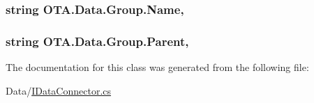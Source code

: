 \subsubsection[{Name}]{\setlength{\rightskip}{0pt plus 5cm}string O\+T\+A.\+Data.\+Group.\+Name\hspace{0.3cm}{\ttfamily [get]}, {\ttfamily [set]}}\label{class_o_t_a_1_1_data_1_1_group_af014f919d424622fe09aa7246e59990e}
\hypertarget{class_o_t_a_1_1_data_1_1_group_abb44e1c5f261b87431a22599e2fb7595}{}
\subsubsection[{Parent}]{\setlength{\rightskip}{0pt plus 5cm}string O\+T\+A.\+Data.\+Group.\+Parent\hspace{0.3cm}{\ttfamily [get]}, {\ttfamily [set]}}\label{class_o_t_a_1_1_data_1_1_group_abb44e1c5f261b87431a22599e2fb7595}


The documentation for this class was generated from the following file\+:\begin{DoxyCompactItemize}
\item 
Data/\hyperlink{_i_data_connector_8cs}{I\+Data\+Connector.\+cs}\end{DoxyCompactItemize}
